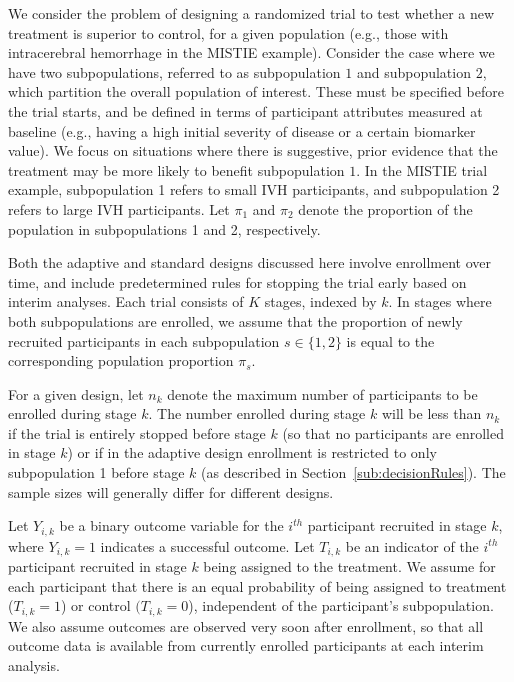 \documentclass[article]{jss}
\begin{document}
We consider the problem of designing a randomized trial to test whether a new treatment is superior to control, for a given population (e.g., those with intracerebral hemorrhage in  the MISTIE example).
Consider the case where we have two subpopulations, referred to as subpopulation $1$ and subpopulation $2$, which partition the overall population of interest. These must be specified before the trial starts, and be defined in terms of participant attributes measured at baseline (e.g., having a high initial severity of disease or a certain biomarker value). 
We focus on situations where  there is suggestive, prior evidence that the treatment may be more likely to benefit subpopulation $1$.
In the MISTIE trial example, subpopulation 1 refers to small IVH participants, and subpopulation 2 refers to large IVH participants. 
Let $π_1$ and $π_2$ denote the proportion of the population in subpopulations 1 and 2, respectively. %

Both the adaptive and standard designs discussed here involve enrollment over time, and include predetermined rules for stopping the trial early based on interim analyses. Each trial consists of $K$ stages, indexed by $k$. 
In stages where both subpopulations are enrolled, we assume that the proportion of newly recruited participants  in each subpopulation $s \in \{1,2\}$ is equal to the corresponding population proportion $\pi_s$. %

For a given design, let $n_k$ denote the maximum number of participants to be enrolled during stage $k$. The number enrolled during stage $k$ will be less than $n_k$ if the trial is entirely stopped before stage $k$ (so that no participants are enrolled in stage $k$) or if in the adaptive design enrollment is restricted to only subpopulation 1 before stage $k$ (as described in Section~\ref{sub:decisionRules}). The sample sizes will generally differ for different designs.

Let $Y_{i,k}$ be a binary outcome variable for the $i^{th}$ participant recruited in stage $k$, where $Y_{i,k}=1$ indicates a successful outcome. Let $T_{i,k}$ be an indicator of   the $i^{th}$ participant recruited in stage $k$ being assigned to the treatment. We assume for each participant that there is an equal probability of being assigned to  treatment ($T_{i,k}=1$) or control $(T_{i,k}=0$), independent of the participant's subpopulation. We also assume outcomes are observed very soon after enrollment, so that all outcome data is available from currently enrolled participants at each interim analysis.
\end{document}
